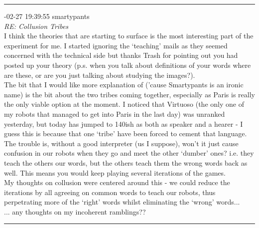 \begin{mail}
\rule{0.8\textwidth}{.4pt}

{-02-27 19:39:55 smartypants}\\
{\itshape RE: Collusion Tribes}\\
I think the theories that are starting to surface is the most interesting part of the experiment for me. 
I started ignoring the `teaching' mails as they seemed concerned with the technical side but thanks Trash for pointing out you had posted up your theory (p.s. when you talk about definitions of your words where are these, or are you just talking about studying the images?).\\
The bit that I would like more explanation of ('cause Smartypants is an ironic name) is the bit about the two tribes coming together, especially as Paris is really the only viable option at the moment. I noticed that Virtuoso (the only one of my robots that managed to get into Paris in the last day) was unranked yesterday, but today has jumped to 140ish as both as speaker and a hearer - I guess this is because that one `tribe' have been forced to cement that language.\\
The trouble is, without a good interpreter (us I suppose), won't it just cause confusion in our robots when they go and meet the other `dumber' ones? i.e. they teach the others our words, but the others teach them the wrong words back as well.
This means you would keep playing several iterations of the games.\\
My thoughts on collusion were centered around this - we could reduce the iterations by all agreeing on common words to teach our robots, thus perpetrating more of the `right' words whilst eliminating the `wrong' words...\\
... any thoughts on my incoherent ramblings??\\

\rule{0.8\textwidth}{.4pt}


\end{mail}
